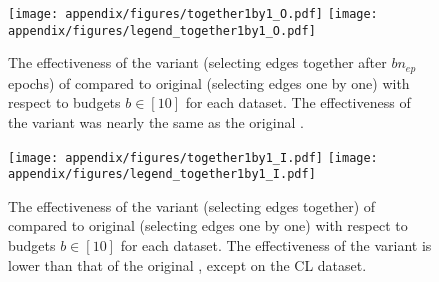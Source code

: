 \begin{table}[h!]
  \centering
    \caption{The minimum budget $b \leq 10$ with which each method runs out of time. Each cell with ``.'' implies that the method did not run out of time even with $b = 10$.}
    \label{tab:budget_min}
\end{table}


\begin{figure}[h!]
    \centering
    \texttt{[image: appendix/figures/together1by1\_O.pdf]}
    \texttt{[image: appendix/figures/legend\_together1by1\_O.pdf]}
    \caption{The effectiveness of the variant (selecting edges together after $bn_{ep}$ epochs) of \adv compared to original \adv (selecting edges one by one) with respect to budgets $b \in [10]$ for each dataset. The effectiveness of the variant was nearly the same as the original \adv.}
    \label{fig:together1by1}
\end{figure}

\begin{figure}[h!]
    \centering
    \texttt{[image: appendix/figures/together1by1\_I.pdf]}
    \texttt{[image: appendix/figures/legend\_together1by1\_I.pdf]}
    \caption{The effectiveness of the variant (selecting edges together) of \advp compared to original \advp (selecting edges one by one) with respect to budgets $b \in [10]$ for each dataset. The effectiveness of the variant is lower than that of the original \adv, except on the CL dataset.}
    \label{fig:together1by1_I}
\end{figure}

